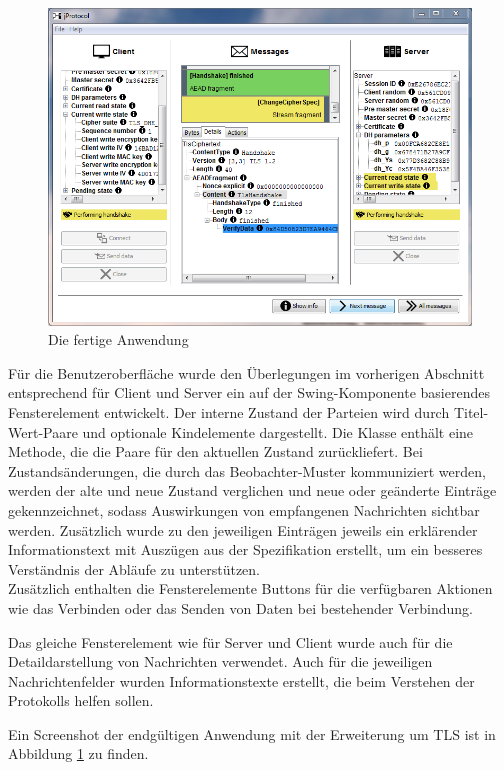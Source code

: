 
\begin{figure}
	\centering
	\includegraphics[scale=0.7]{Diagrams/ScreenshotTLS.png} 
	\caption{Die fertige Anwendung}
	\label{fig_application_screenshot}
\end{figure}

Für die Benutzeroberfläche wurde den Überlegungen im vorherigen Abschnitt entsprechend für Client und Server ein auf der Swing-Komponente  basierendes Fensterelement entwickelt. Der interne Zustand der Parteien wird durch Titel-Wert-Paare und optionale Kindelemente dargestellt. Die Klasse  enthält eine Methode, die die Paare für den aktuellen Zustand zurückliefert. Bei Zustandsänderungen, die durch das Beobachter-Muster kommuniziert werden, werden der alte und neue Zustand verglichen und neue oder geänderte Einträge gekennzeichnet, sodass Auswirkungen von empfangenen Nachrichten sichtbar werden. Zusätzlich wurde zu den jeweiligen Einträgen jeweils ein erklärender Informationstext mit Auszügen aus der Spezifikation erstellt, um ein besseres Verständnis der Abläufe zu unterstützen.\\
Zusätzlich enthalten die Fensterelemente Buttons für die verfügbaren Aktionen wie das Verbinden oder das Senden von Daten bei bestehender Verbindung.

Das gleiche Fensterelement wie für Server und Client wurde auch für die Detaildarstellung von Nachrichten verwendet. Auch für die jeweiligen Nachrichtenfelder wurden Informationstexte erstellt, die beim Verstehen der Protokolls helfen sollen.

Ein Screenshot der endgültigen Anwendung mit der Erweiterung um TLS ist in Abbildung \ref{fig_application_screenshot} zu finden.